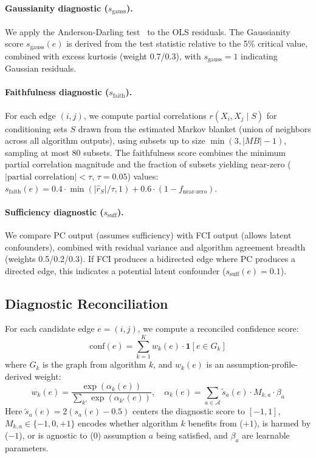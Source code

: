 \documentclass{article}
\newcommand{\conf}{\mathrm{conf}}
\begin{document}
\paragraph{Gaussianity diagnostic ($s_{\mathrm{gauss}}$).}
We apply the Anderson-Darling test~\citep{anderson1952asymptotic} to the OLS residuals.
The Gaussianity score $s_{\mathrm{gauss}}(e)$ is derived from the test statistic relative to the 5\% critical value, combined with excess kurtosis (weight 0.7/0.3), with $s_{\mathrm{gauss}} = 1$ indicating Gaussian residuals.

\paragraph{Faithfulness diagnostic ($s_{\mathrm{faith}}$).}
For each edge $(i,j)$, we compute partial correlations $r(X_i, X_j \mid S)$ for conditioning sets $S$ drawn from the estimated Markov blanket (union of neighbors across all algorithm outputs), using subsets up to size $\min(3, |MB|-1)$, sampling at most 80 subsets.
The faithfulness score combines the minimum partial correlation magnitude and the fraction of subsets yielding near-zero ($|\text{partial correlation}| < \tau$, $\tau = 0.05$) values: $s_{\mathrm{faith}}(e) = 0.4 \cdot \min(|\hat{r}_S|/\tau, 1) + 0.6 \cdot (1 - f_{\mathrm{near\text{-}zero}})$.

\paragraph{Sufficiency diagnostic ($s_{\mathrm{suff}}$).}
We compare PC output (assumes sufficiency) with FCI output (allows latent confounders), combined with residual variance and algorithm agreement breadth (weights 0.5/0.2/0.3).
If FCI produces a bidirected edge where PC produces a directed edge, this indicates a potential latent confounder ($s_{\mathrm{suff}}(e) = 0.1$).

\subsection{Diagnostic Reconciliation}

For each candidate edge $e = (i,j)$, we compute a reconciled confidence score:
\begin{equation}
\conf(e) = \sum_{k=1}^{K} w_k(e) \cdot \mathbf{1}[e \in G_k]
\label{eq:conf}
\end{equation}
where $G_k$ is the graph from algorithm $k$, and $w_k(e)$ is an assumption-profile-derived weight:
\begin{equation}
w_k(e) = \frac{\exp(\alpha_k(e))}{\sum_{k'} \exp(\alpha_{k'}(e))}, \quad
\alpha_k(e) = \sum_{a \in \mathcal{A}} \tilde{s}_a(e) \cdot M_{k,a} \cdot \beta_a
\label{eq:weights}
\end{equation}
Here $\tilde{s}_a(e) = 2(s_a(e) - 0.5)$ centers the diagnostic score to $[-1, 1]$, $M_{k,a} \in \{-1, 0, +1\}$ encodes whether algorithm $k$ benefits from ($+1$), is harmed by ($-1$), or is agnostic to ($0$) assumption $a$ being satisfied, and $\beta_a$ are learnable parameters.
\end{document}
